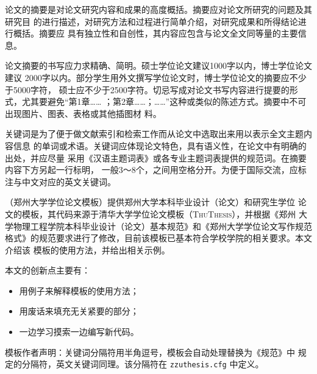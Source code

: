 \begin{cabstract}

论文的摘要是对论文研究内容和成果的高度概括。摘要应对论文所研究的问题及其研究目
的进行描述，对研究方法和过程进行简单介绍，对研究成果和所得结论进行概括。摘要应
具有独立性和自创性，其内容应包含与论文全文同等量的主要信息。

论文摘要的书写应力求精确、简明。硕士学位论文建议1000字以内，博士学位论文建议
2000字以内。部分学生用外文撰写学位论文时，博士学位论文的摘要应不少于5000字符，
硕士应不少于2500字符。切忌写成对论文书写内容进行提要的形式，尤其要避免“第1章……
；第2章……；……”这种或类似的陈述方式。摘要中不可出现图片、图表、表格或其他插图材
料。

关键词是为了便于做文献索引和检索工作而从论文中选取出来用以表示全文主题内容信息
的单词或术语。关键词应体现论文特色，具有语义性，在论文中有明确的出处，并应尽量
采用《汉语主题词表》或各专业主题词表提供的规范词。在摘要内容下方另起一行标明，
一般3～8个，之间用空格分开。为便于国际交流，应标注与中文对应的英文关键词。

\zzuthesis{}（郑州大学学位论文模板）提供郑州大学本科毕业设计（论文）和研究生学位
论文的模板，其代码来源于清华大学学位论文模板（\textsc{ThuThesis}），并根据《郑州
大学物理工程学院本科毕业设计（论文）基本规范》和《郑州大学学位论文写作规范
格式》的规范要求进行了修改，目前该模板已基本符合学校学院的相关要求。本文介绍该
模板的使用方法，并给出相关示例。

本文的创新点主要有：

  \begin{itemize}
    \item 用例子来解释模板的使用方法；
    \item 用废话来填充无关紧要的部分；
    \item 一边学习摸索一边编写新代码。
  \end{itemize}

\textsf{模板作者声明}：关键词分隔符用半角逗号，模板会自动处理替换为《规范》中
规定的分隔符，英文关键词同理。该分隔符在 \verb|zzuthesis.cfg| 中定义。


\end{cabstract}

